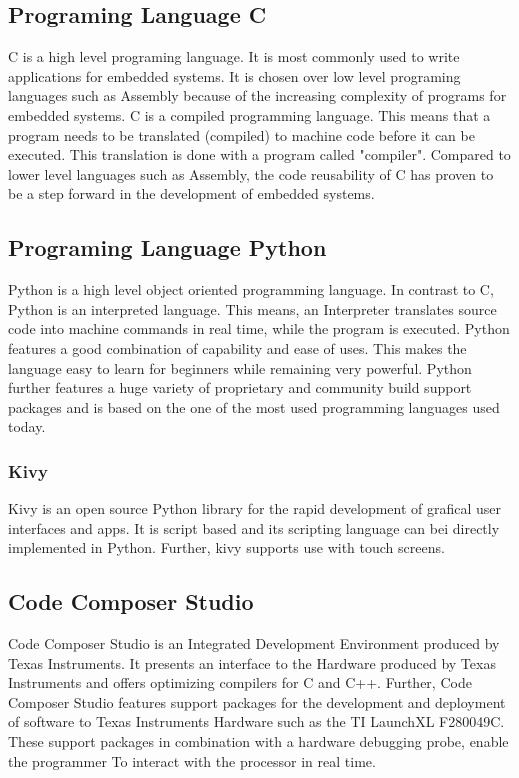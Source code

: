 \subsection{Programing Language C}
C is a high level programing language. It is most commonly used to write applications for embedded systems. It is chosen over low level programing languages 
such as Assembly because of the increasing complexity of programs for embedded systems. C is a compiled programming language. This means that a program needs to be translated (compiled) to machine code before it can be executed. 
This translation is done with a program called "compiler". Compared to lower level languages such as Assembly, the code reusability of C has proven to be a step forward in the development of embedded systems.\cite{ISO2022}


\subsection{Programing Language Python}
Python is a high level object oriented programming language. In contrast to C, Python is an interpreted language. This means, an Interpreter translates source code into machine commands in 
real time, while the program is executed. Python features a good combination of capability and ease of uses. This makes the language easy to learn for beginners while remaining very powerful.
Python further features a huge variety of proprietary and community build support packages and is based on the one of the most used programming languages used today.\cite{PythonFoundation2022}

\subsubsection{Kivy}
Kivy is an open source Python library for the rapid development of grafical user interfaces and apps. 
It is script based and its scripting language can bei directly implemented in Python. Further, kivy supports use with touch screens.\cite{Kivy.org2022}


\subsection{Code Composer Studio}
Code Composer Studio is an Integrated Development Environment produced by Texas Instruments. It presents an interface to the Hardware produced by Texas Instruments and offers optimizing compilers for C and C++. 
Further, Code Composer Studio features support packages for the development and deployment of software to Texas Instruments Hardware such as the TI LaunchXL F280049C.
These support packages in combination with a hardware debugging probe, enable the programmer To interact with the processor in real time.\cite{Instruments2022}



